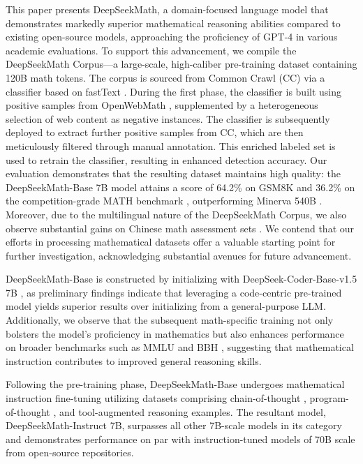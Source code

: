 This paper presents DeepSeekMath, a domain-focused language model that demonstrates markedly superior mathematical reasoning abilities compared to existing open-source models, approaching the proficiency of GPT-4 in various academic evaluations. To support this advancement, we compile the DeepSeekMath Corpus—a large-scale, high-caliber pre-training dataset containing 120B math tokens. The corpus is sourced from Common Crawl (CC) via a classifier based on fastText \citep{joulin2016fasttext}. During the first phase, the classifier is built using positive samples from OpenWebMath \citep{openwebmath}, supplemented by a heterogeneous selection of web content as negative instances. The classifier is subsequently deployed to extract further positive samples from CC, which are then meticulously filtered through manual annotation. This enriched labeled set is used to retrain the classifier, resulting in enhanced detection accuracy. Our evaluation demonstrates that the resulting dataset maintains high quality: the DeepSeekMath-Base 7B model attains a score of 64.2\% on GSM8K \citep{gsm8k} and 36.2\% on the competition-grade MATH benchmark \citep{MATH}, outperforming Minerva 540B \citep{minerva}. Moreover, due to the multilingual nature of the DeepSeekMath Corpus, we also observe substantial gains on Chinese math assessment sets \citep{wei2023cmath,agieval}. We contend that our efforts in processing mathematical datasets offer a valuable starting point for further investigation, acknowledging substantial avenues for future advancement.

DeepSeekMath-Base is constructed by initializing with DeepSeek-Coder-Base-v1.5 7B \citep{deepseek-coder}, as preliminary findings indicate that leveraging a code-centric pre-trained model yields superior results over initializing from a general-purpose LLM. Additionally, we observe that the subsequent math-specific training not only bolsters the model's proficiency in mathematics but also enhances performance on broader benchmarks such as MMLU \citep{mmlu} and BBH \citep{bbh}, suggesting that mathematical instruction contributes to improved general reasoning skills.

Following the pre-training phase, DeepSeekMath-Base undergoes mathematical instruction fine-tuning utilizing datasets comprising chain-of-thought \citep{cot}, program-of-thought \citep{pot,pal}, and tool-augmented reasoning \citep{tora} examples. The resultant model, DeepSeekMath-Instruct 7B, surpasses all other 7B-scale models in its category and demonstrates performance on par with instruction-tuned models of 70B scale from open-source repositories.


